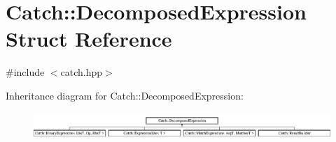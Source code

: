 \hypertarget{struct_catch_1_1_decomposed_expression}{}\section{Catch\+:\+:Decomposed\+Expression Struct Reference}
\label{struct_catch_1_1_decomposed_expression}


{\ttfamily \#include $<$catch.\+hpp$>$}

Inheritance diagram for Catch\+:\+:Decomposed\+Expression\+:\begin{figure}[H]
\begin{center}
\leavevmode
\includegraphics[height=1.029412cm]{struct_catch_1_1_decomposed_expression}
\end{center}
\end{figure}
